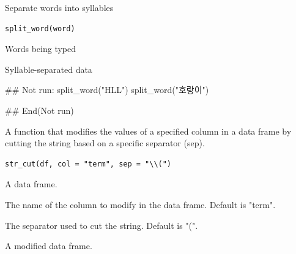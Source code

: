 \documentclass[a4paper]{book}
\begin{document}
%
\begin{Description}
Separate words into syllables
\end{Description}
%
\begin{Usage}
\begin{verbatim}
split_word(word)
\end{verbatim}
\end{Usage}
%
\begin{Arguments}
\begin{ldescription}
\item[\code{word}] Words being typed
\end{ldescription}
\end{Arguments}
%
\begin{Value}
Syllable-separated data
\end{Value}
%
\begin{Examples}
\begin{ExampleCode}

## Not run: 
split_word("HLL")
split_word("호랑이")


## End(Not run)

\end{ExampleCode}
\end{Examples}
%
\begin{Description}
A function that modifies the values of a specified column in a data frame by cutting the string based on a specific separator (sep).
\end{Description}
%
\begin{Usage}
\begin{verbatim}
str_cut(df, col = "term", sep = "\\(")
\end{verbatim}
\end{Usage}
%
\begin{Arguments}
\begin{ldescription}
\item[\code{df}] A data frame.

\item[\code{col}] The name of the column to modify in the data frame. Default is "term".

\item[\code{sep}] The separator used to cut the string. Default is "\bsl{}(".
\end{ldescription}
\end{Arguments}
%
\begin{Value}
A modified data frame.
\end{Value}
\end{document}
